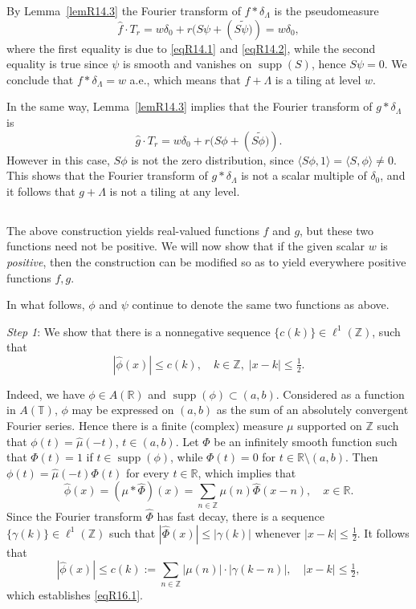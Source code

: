 \documentclass[reqno,a4paper,12pt]{amsart}
\numberwithin{equation}{section}
\numberwithin{figure}{section}
\newcommand\R{\mathbb{R}}
\newcommand\Z{\mathbb{Z}}
\newcommand\T{\mathbb{T}}
\newcommand\Lam{\Lambda}
\newcommand\1{\mathds{1}}
\renewcommand\leq{\leqslant}
\newcommand\sbt{\subset}
\newcommand{\ft}[1]{\widehat{#1}}
\newcommand{\dotprod}[2]{\langle #1 , #2 \rangle}
\newcommand{\supp}{\operatorname{supp}}
\newcommand{\half}{\tfrac{1}{2}}
\theoremstyle{plain}
\newcommand{\lemref}[1]{Lemma~\ref{#1}}
\theoremstyle{definition}
\begin{document}
By \lemref{lemR14.3} the Fourier transform of $f \ast \delta_\Lam$ is the pseudomeasure 
\[
\ft{f} \cdot T_r = w \delta_0 + r ( S \psi  + (\widetilde{S \psi)}) =
w \delta_0,
\]
where the first equality is 
due to \eqref{eqR14.1}
and \eqref{eqR14.2},
while the second equality 
is true since $\psi$ is
smooth and vanishes on $\supp(S)$, 
hence $S \psi =0$.
We conclude that 
$f \ast \delta_\Lam = w$ a.e., which means
that  $f + \Lambda$ is a tiling at level $w$.


In the same way,
 \lemref{lemR14.3}  implies 
that  the Fourier transform of $g \ast \delta_\Lam$ is 
\[
\ft{g} \cdot T_r = w \delta_0 + r (S \phi  + (\widetilde{S \phi)}).
\]
However in this case, $S \phi$ is not the
zero distribution, since $\dotprod{S\phi}{1} = 
\dotprod{S}{\phi} \neq 0$.
This shows  that 
the Fourier transform of $g \ast \delta_\Lam$ is 
not a scalar multiple
of $\delta_0$, and it follows that
 $g + \Lambda$ is not a tiling at any level.

\subsection{}
The above construction yields real-valued functions
$f$ and $g$, but 
these two functions need not be positive. We will now show that
if the given scalar $w$ is  \emph{positive},  then 
the construction  can be modified so as to
yield everywhere positive functions $f,g$.

In what follows, $\phi$ and
$\psi$  continue to denote the same two functions as above.




\emph{Step 1}: We show that there is a nonnegative sequence
 $\{c(k)\} \in \ell^1(\Z)$, such that
 \begin{equation}
\label{eqR16.1}
|\ft{\phi}(x)| \leq c(k), \quad k \in \Z, \; |x - k| \leq \half.
 \end{equation}


Indeed, we have $\phi  \in A(\R)$ and
$\supp(\phi) \sbt (a,b)$. Considered as a
function in $A(\T)$, $\phi$ may be expressed
on $(a,b)$ as  the sum
of an absolutely convergent Fourier
series. Hence 
there is a finite (complex) measure $\mu$ supported on $\Z$ 
such that $\phi(t) = \ft{\mu}(-t)$, $t \in (a,b)$.
 Let $\Phi$ be 
an infinitely smooth
 function  such that
$\Phi(t)=1$ if $t \in \supp(\phi)$,
while $\Phi(t)=0$ for $t \in \R \setminus (a,b)$.
Then $\phi(t) = \ft{\mu}(-t) \Phi(t)$ for
every $t \in \R$, which implies that
\[
\ft{\phi}(x) = (\mu \ast \ft{\Phi})(x) = \sum_{n \in \Z} {\mu}(n) \ft{\Phi}(x-n),
\quad x \in \R.
\]
Since the Fourier transform $\ft{\Phi}$ has fast decay, there is
a sequence 
 $\{\gamma(k)\} \in \ell^1(\Z)$ such that
$|\ft{\Phi}(x)| \leq |\gamma(k)|$ whenever
$|x - k| \leq \half$. It follows that
\[
|\ft{\phi}(x)| \leq c(k) := \sum_{n \in \Z} |{\mu}(n)| \cdot | \gamma(k-n)|,
\quad |x-k| \leq \half,
\]
which establishes \eqref{eqR16.1}.
\end{document}
